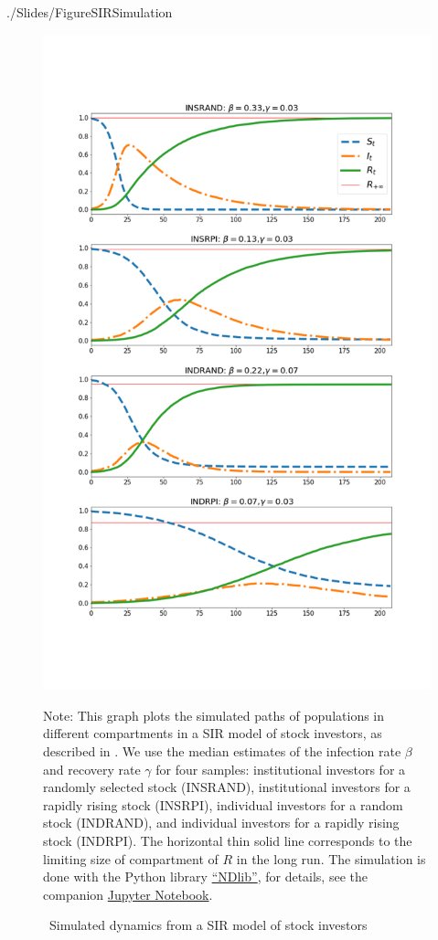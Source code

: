 \begin{verbatimwrite}{./Slides/FigureSIRSimulation}%
  \begin{figure} \centering  %
    \caption{ ~Simulated dynamics from a SIR model of stock investors}
    \label{fig:sir_simulate}
    \centerline{\includegraphics[width=1.2\textwidth,height=1.2\textheight]{./figures/sir_simulate}}
    \begin{flushleft}
      {\footnotesize Note: This graph plots the simulated paths of populations in different compartments in a SIR model of stock investors, as described in \cite{shiller1989survey}. We use the median estimates of the infection rate $\beta$ and recovery rate $\gamma$ for four samples: institutional investors for a randomly selected stock (INSRAND), institutional investors for a rapidly rising stock (INSRPI), individual investors for a random stock (INDRAND), and individual investors for a rapidly rising stock (INDRPI). The horizontal thin solid line corresponds to the limiting size of compartment of $R$ in the long run. The simulation is done with the Python library \href{https://ndlib.readthedocs.io/en/latest/}{``NDlib''}, for details, see the companion \href{https://github.com/llorracc/EpiExp/blob/master/SIR_Ndlib.ipynb}{Jupyter Notebook}. }

\end{flushleft}
\end{figure}
\end{verbatimwrite}
